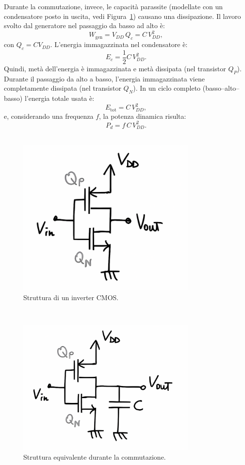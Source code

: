 Durante la commutazione, invece, le capacità parassite (modellate con un condensatore posto in uscita, vedi Figura~\ref{fig:inverter_potenza}) causano una dissipazione. Il lavoro svolto dal generatore nel passaggio da basso ad alto è:
\[
W_{\text{gen}} = V_{DD}\, Q_c = C\, V_{DD}^2,
\]
con \(Q_c = C V_{DD}\). L'energia immagazzinata nel condensatore è:
\[
E_c = \frac{1}{2}C\, V_{DD}^2.
\]
Quindi, metà dell'energia è immagazzinata e metà dissipata (nel transistor \(Q_P\)). Durante il passaggio da alto a basso, l’energia immagazzinata viene completamente dissipata (nel transistor \(Q_N\)). In un ciclo completo (basso–alto–basso) l'energia totale usata è:
\[
E_{\text{tot}} = C\, V_{DD}^2,
\]
e, considerando una frequenza \(f\), la potenza dinamica risulta:
\[
P_d = f\, C\, V_{DD}^2.
\]
\\[2mm]
\begin{figure}[H]
    \centering
    \includegraphics[width=0.8\textwidth]{images/2.1.2.1.png}
    \caption{Struttura di un inverter CMOS.}
    \label{fig:inverter_potenza}
\end{figure}

\\[2mm]
\begin{figure}[H]
    \centering
    \includegraphics[width=0.8\textwidth]{images/2.1.2.2.png}
    \caption{Struttura equivalente durante la commutazione.}
    \label{fig:inverter_potenza_eq}
\end{figure}

